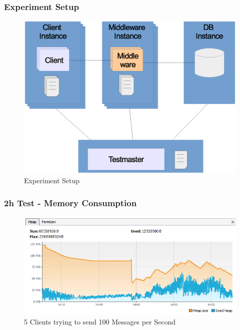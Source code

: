 \documentclass{beamer}
\begin{document}
\begin{frame}
\frametitle{Experiment Setup}
\begin{figure}
  \begin{center}
    \includegraphics[scale=0.4]{../../drawings/testsystem-overview.eps}
  \end{center}
  \caption{Experiment Setup}
  \label{fig:testsystem}
\end{figure}
\end{frame}




\begin{frame}
\frametitle{2h Test - Memory Consumption}
\begin{figure}
  \begin{center}
    \includegraphics[scale=0.6]{5clientsAt100msPerSecond.PNG}
  \end{center}
  \caption{5 Clients trying to send 100 Messages per Second}
  \label{fig:testsystem}
\end{figure}

\end{frame}
\end{document}
